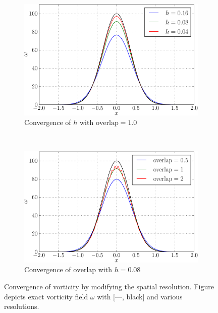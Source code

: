 \begin{figure}[b]
        \centering
        \begin{subfigure}[b]{0.5\textwidth}
                \includegraphics[width=\textwidth]{figures/lagrangian/betterInitialization_h-crop.pdf}
                \caption{Convergence of $h$ with $\mathrm{overlap} = 1.0$}
                \label{fig:convergenceOfBlobsH}
        \end{subfigure}%
        ~ %
        \begin{subfigure}[b]{0.5\textwidth}
                \includegraphics[width=\textwidth]{figures/lagrangian/betterInitialization_overlap-crop.pdf}
                \caption{Convergence of $\mathrm{overlap}$ with $h = 0.08$}
                \label{fig:convergenceOfBlobsOverlap}
        \end{subfigure}
        \caption{Convergence of vorticity by modifying the spatial resolution. Figure depicts exact vorticity field $\omega$ with [---, black] and various resolutions.}
        \label{fig:convergenceOfSpatialResolution}
\end{figure}	


